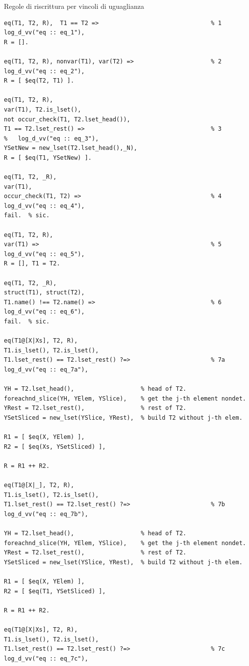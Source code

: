 \documentclass[12pt,a4paper,openright]{book} %
\begin{document}
\begin{algorithm}[H]
	\caption{Regole di riscrittura per vincoli di uguaglianza}
	\label{alg:eq_constraints}
\end{algorithm}
\begin{verbatim}
eq(T1, T2, R),  T1 == T2 =>                                % 1
log_d_vv("eq :: eq_1"),
R = [].

eq(T1, T2, R), nonvar(T1), var(T2) =>                      % 2
log_d_vv("eq :: eq_2"),
R = [ $eq(T2, T1) ].

eq(T1, T2, R), 
var(T1), T2.is_lset(),
not occur_check(T1, T2.lset_head()),
T1 == T2.lset_rest() =>                                    % 3
%	log_d_vv("eq :: eq_3"),
YSetNew = new_lset(T2.lset_head(),_N),
R = [ $eq(T1, YSetNew) ].

eq(T1, T2, _R), 
var(T1),
occur_check(T1, T2) =>                                     % 4
log_d_vv("eq :: eq_4"),
fail.  % sic.

eq(T1, T2, R), 
var(T1) =>                                                 % 5
log_d_vv("eq :: eq_5"),
R = [], T1 = T2.

eq(T1, T2, _R), 
struct(T1), struct(T2), 
T1.name() !== T2.name() =>                                 % 6
log_d_vv("eq :: eq_6"),
fail.  % sic.

eq(T1@[X|Xs], T2, R), 
T1.is_lset(), T2.is_lset(),
T1.lset_rest() == T2.lset_rest() ?=>                       % 7a
log_d_vv("eq :: eq_7a"),

YH = T2.lset_head(),                   % head of T2.
foreachnd_slice(YH, YElem, YSlice),    % get the j-th element nondet.
YRest = T2.lset_rest(),                % rest of T2.
YSetSliced = new_lset(YSlice, YRest),  % build T2 without j-th elem.

R1 = [ $eq(X, YElem) ],
R2 = [ $eq(Xs, YSetSliced) ],

R = R1 ++ R2.

eq(T1@[X|_], T2, R), 
T1.is_lset(), T2.is_lset(),
T1.lset_rest() == T2.lset_rest() ?=>                       % 7b
log_d_vv("eq :: eq_7b"),

YH = T2.lset_head(),                   % head of T2.
foreachnd_slice(YH, YElem, YSlice),    % get the j-th element nondet.
YRest = T2.lset_rest(),                % rest of T2.
YSetSliced = new_lset(YSlice, YRest),  % build T2 without j-th elem.

R1 = [ $eq(X, YElem) ],
R2 = [ $eq(T1, YSetSliced) ],

R = R1 ++ R2.

eq(T1@[X|Xs], T2, R),
T1.is_lset(), T2.is_lset(),
T1.lset_rest() == T2.lset_rest() ?=>                       % 7c
log_d_vv("eq :: eq_7c"),


\end{verbatim}
\end{document}
